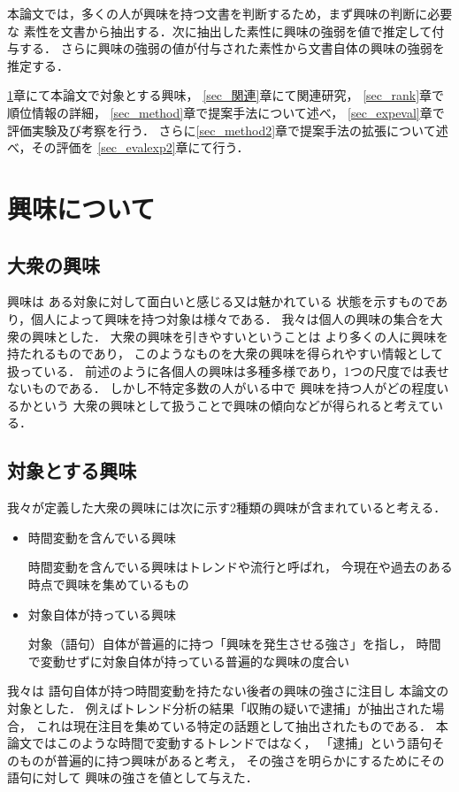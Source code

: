 \documentclass[japanese]{jnlp_1.4}
\newcounter{ex}
\begin{document}
本論文では，多くの人が興味を持つ文書を判断するため，まず興味の判断に必要な
素性を文書から抽出する．次に抽出した素性に興味の強弱を値で推定して付与する．
さらに興味の強弱の値が付与された素性から文書自体の興味の強弱を推定する．



\ref{sec_興味}章にて本論文で対象とする興味，
\ref{sec_関連}章にて関連研究，
\ref{sec_rank}章で順位情報の詳細，
\ref{sec_method}章で提案手法について述べ，
\ref{sec_expeval}章で評価実験及び考察を行う．
さらに\ref{sec_method2}章で提案手法の拡張について述べ，その評価を
\ref{sec_evalexp2}章にて行う．


\section{興味について}\label{sec_興味}
\subsection{大衆の興味}

興味は
ある対象に対して面白いと感じる又は魅かれている
状態を示すものであり，個人によって興味を持つ対象は様々である．
我々は個人の興味の集合を大衆の興味とした．
大衆の興味を引きやすいということは
より多くの人に興味を持たれるものであり，
このようなものを大衆の興味を得られやすい情報として扱っている．
前述のように各個人の興味は多種多様であり，1つの尺度では表せないものである．
しかし不特定多数の人がいる中で
興味を持つ人がどの程度いるかという
大衆の興味として扱うことで興味の傾向などが得られると考えている．


\subsection{対象とする興味}

我々が定義した大衆の興味には次に示す2種類の興味が含まれていると考える．
\begin{itemize}
\item 時間変動を含んでいる興味

      時間変動を含んでいる興味はトレンドや流行と呼ばれ，
      今現在や過去のある時点で興味を集めているもの
\item 対象自体が持っている興味

      対象（語句）自体が普遍的に持つ「興味を発生させる強さ」を指し，
      時間で変動せずに対象自体が持っている普遍的な興味の度合い
\end{itemize}
我々は
語句自体が持つ時間変動を持たない後者の興味の強さに注目し
本論文の対象とした．
例えばトレンド分析の結果「収賄の疑いで逮捕」が抽出された場合，
これは現在注目を集めている特定の話題として抽出されたものである．
本論文ではこのような時間で変動するトレンドではなく，
「逮捕」という語句そのものが普遍的に持つ興味があると考え，
その強さを明らかにするためにその語句に対して
興味の強さを値として与えた．
\end{document}
